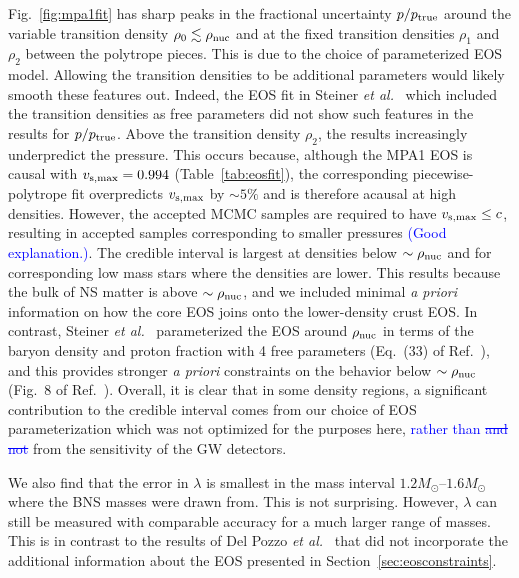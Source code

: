\documentclass[twocolumn,prd,amssymb,aps,nofootinbib,showpacs,epsf]{revtex4}
\newcommand\les[2]{\textcolor{blue}{{#1}\sout{#2}}}
\begin{document}
Fig.~\ref{fig:mpa1fit} has sharp peaks in the fractional uncertainty $p/p_{\rm true}$ around the variable transition density $\rho_0 \lesssim \rho_{\rm nuc}$ and at the fixed transition densities $\rho_1$ and $\rho_2$ between the polytrope pieces. This is due to the choice of parameterized EOS model. Allowing the transition densities to be additional parameters would likely smooth these features out. Indeed, the EOS fit in Steiner {\it et al.}~\cite{SteinerLattimerBrown2010} which included the transition densities as free parameters did not show such features in the results for $p/p_{\rm true}$. Above the transition density $\rho_2$, the results increasingly underpredict the pressure. This occurs because, although the MPA1 EOS is causal with $v_{\rm s,max}=0.994$ (Table~\ref{tab:eosfit}), the corresponding piecewise-polytrope fit overpredicts $v_{\rm s,max}$ by $\sim 5\%$ and is therefore acausal at high densities. However, the accepted MCMC samples are required to have $v_{\rm s,max} \leq c$, resulting in accepted samples corresponding to smaller pressures \les{(Good explanation.)}{}. The credible interval is largest at densities below $\sim \rho_{\rm nuc}$ and for corresponding low mass stars where the densities are lower. This results because the bulk of NS matter is above $\sim \rho_{\rm nuc}$, and we included minimal {\it a priori} information on how the core EOS joins onto the lower-density crust EOS. In contrast, Steiner {\it et al.}~\cite{SteinerLattimerBrown2010} parameterized the EOS around $\rho_{\rm nuc}$ in terms of the baryon density and proton fraction with 4 free parameters (Eq.~(33) of Ref.~\cite{SteinerLattimerBrown2010}), and this provides stronger {\it a priori} constraints on the behavior below $\sim \rho_{\rm nuc}$ (Fig.~8 of Ref.~\cite{SteinerLattimerBrown2010}). Overall, it is clear that in some density regions, a significant contribution to the credible interval comes from our choice of EOS parameterization which was not optimized for the purposes here, \les{rather than}{ and not} from the sensitivity of the GW detectors. 

We also find that the error in $\lambda$ is smallest in the mass interval $1.2M_\odot$--$1.6M_\odot$ where the BNS masses were drawn from. This is not surprising. However, $\lambda$ can still be measured with comparable accuracy for a much larger range of masses. This is in contrast to the results of Del Pozzo {\it et al.}~\cite{DelPozzoLiAgathos2013} that did not incorporate the additional information about the EOS presented in Section~\ref{sec:eosconstraints}.
\end{document}
